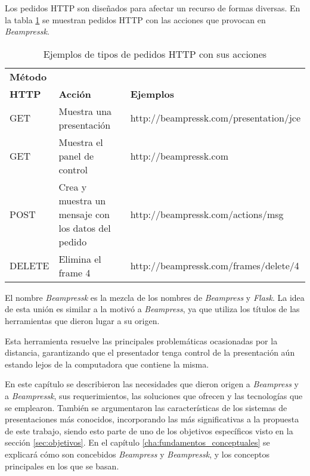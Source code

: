 			Los pedidos HTTP son diseñados para afectar un recurso de formas diversas. En la tabla \ref{tab:request} se muestran pedidos HTTP con las acciones que provocan en \textit{Beampressk}.

			\begin{table}[b]
				\caption{Ejemplos de tipos de pedidos HTTP con sus acciones}
				\label{tab:request}
				\centering
			
				\begin{tabular}{| l | p{4.25cm} | p{6.75cm} |}
				\hline
			
				\hline
				\textbf{Método} & & \\ 
				\textbf{HTTP} & \textbf{Acción} & \textbf{Ejemplos} \\
				\hline
					GET & Muestra una presentación &  http://beampressk.com/presentation/jce \\ 
				\hline

				\hline
					GET & Muestra el panel de control &  http://beampressk.com \\ 
				\hline

				\hline
					POST & Crea y muestra un mensaje con los datos del pedido &  http://beampressk.com/actions/msg \\ 
				\hline

				\hline
					DELETE & Elimina el frame 4 &  http://beampressk.com/frames/delete/4 \\ 
				\hline										
			
				\hline
				\end{tabular}
			\end{table}		

		El nombre \textit{Beampressk} es la mezcla de los nombres de \textit{Beampress} y \textit{Flask}. La idea de esta unión es similar a la motivó a \textit{Beampress}, ya que utiliza los títulos de las herramientas que dieron lugar a su origen.

		Esta herramienta resuelve las principales problemáticas ocasionadas por la distancia, garantizando que el presentador tenga control de la presentación aún estando lejos de la computadora que contiene la misma.


		En este capítulo se describieron las necesidades que dieron origen a \textit{Beampress} y a \textit{Beampressk}, sus requerimientos, las soluciones que ofrecen y las tecnologías que se emplearon. También se argumentaron las características de los sistemas de presentaciones más conocidos, incorporando las más significativas a la propuesta de este trabajo, siendo esto parte de uno de los objetivos específicos visto en la sección \ref{sec:objetivos}. En el capítulo \ref{cha:fundamentos_conceptuales} se explicará cómo son concebidos \textit{Beampress} y \textit{Beampressk}, y los conceptos principales en los que se basan.






